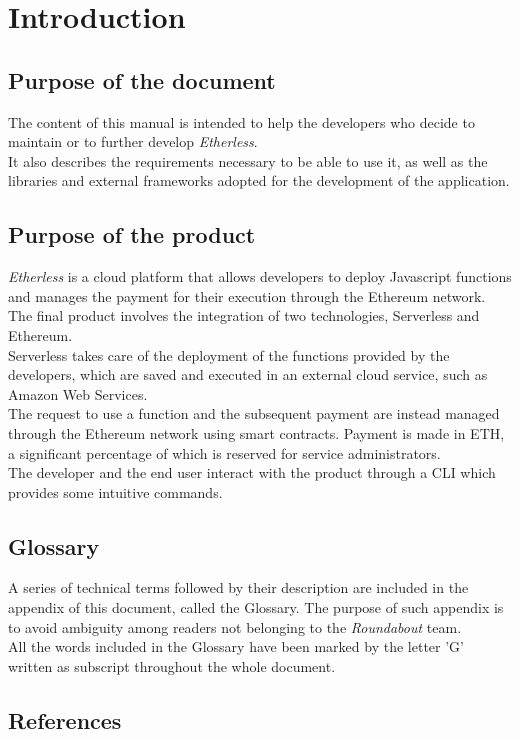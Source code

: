 \section{Introduction}

	\subsection{Purpose of the document}
	The content of this manual is intended to help the developers who decide to maintain or to further develop \textit{Etherless}. \\
	It also describes the requirements necessary to be able to use it, as well as the libraries and external frameworks adopted for the development of the application.
	
	
	\subsection{Purpose of the product}
	\textit{Etherless} is a cloud platform that allows developers to deploy Javascript functions and manages the payment for their execution through the Ethereum network.
	The final product involves the integration of two technologies, Serverless and Ethereum.\\
	Serverless takes care of the deployment of the functions provided by the developers, which are saved and executed in an external cloud service, such as Amazon Web Services.\\
	The request to use a function and the subsequent payment are instead managed through the Ethereum network using smart contracts. Payment is made in ETH, a significant percentage of which is reserved for service administrators.\\
	The developer and the end user interact with the product through a CLI which provides some intuitive commands.

	
	\subsection{Glossary}
	A series of technical terms followed by their description are included in the appendix of this document, called the Glossary. The purpose of such appendix is to avoid ambiguity among readers not belonging to the \textit{Roundabout} team.\\
	All the words included in the Glossary have been marked by the letter 'G' written as subscript throughout the whole document.
	
	
	\subsection{References}
	
